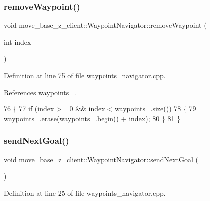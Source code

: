 \subsubsection{\texorpdfstring{remove\+Waypoint()}{removeWaypoint()}}
{\footnotesize\ttfamily void move\+\_\+base\+\_\+z\+\_\+client\+::\+Waypoint\+Navigator\+::remove\+Waypoint (\begin{DoxyParamCaption}\item[{int}]{index }\end{DoxyParamCaption})}



Definition at line 75 of file waypoints\+\_\+navigator.\+cpp.



References waypoints\+\_\+.


\begin{DoxyCode}
76 \{
77   \textcolor{keywordflow}{if} (index >= 0 && index < \hyperlink{classmove__base__z__client_1_1WaypointNavigator_a83e4e39987eaf1c8856d32d581eb4cd0}{waypoints\_}.size())
78   \{
79     \hyperlink{classmove__base__z__client_1_1WaypointNavigator_a83e4e39987eaf1c8856d32d581eb4cd0}{waypoints\_}.erase(\hyperlink{classmove__base__z__client_1_1WaypointNavigator_a83e4e39987eaf1c8856d32d581eb4cd0}{waypoints\_}.begin() + index);
80   \}
81 \}
\end{DoxyCode}
\mbox{\label{classmove__base__z__client_1_1WaypointNavigator_a376c1b5f822325122d29ad4f6e568b08}} 
\subsubsection{\texorpdfstring{send\+Next\+Goal()}{sendNextGoal()}}
{\footnotesize\ttfamily void move\+\_\+base\+\_\+z\+\_\+client\+::\+Waypoint\+Navigator\+::send\+Next\+Goal (\begin{DoxyParamCaption}{ }\end{DoxyParamCaption})}



Definition at line 25 of file waypoints\+\_\+navigator.\+cpp.



